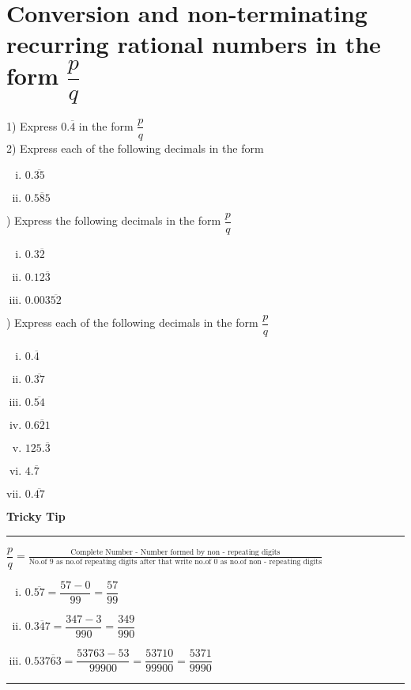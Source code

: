 \documentclass[a4paper,10pt]{article}
\begin{document}
\section{Conversion and non-terminating recurring rational numbers in
the form $\dfrac{p}{q}$}
1) Express $0.\overline{4}$ in the form $\dfrac{p}{q}$\\
2) Express each of the following decimals in the form 
\begin{multicols}{2}
\begin{enumerate}[(i)]
\item $0.\overline{35}$
\item $0.\overline{585}$
\end{enumerate}
\end{multicols}
) Express the following decimals in the form $\dfrac{p}{q}$
\begin{multicols}{3}
\begin{enumerate}[(i)]
\item $0.3\overline{2}$
\item $0.12\overline{3}$
\item $0.003\overline{52}$
\end{enumerate}
\end{multicols}
) Express each of the following decimals in the form $\dfrac{p}{q}$
\begin{multicols}{7}
\begin{enumerate}[(i)]
\item $0.\overline{4}$
\item $0.\overline{37}$
\item $0.\overline{54}$
\item $0.\overline{621}$
\item $125.\overline{3}$
\item $4.\overline{7}$
\item $0.\overline{47}$
\end{enumerate}
\end{multicols}
\newpage
\begin{center}
\textbf{\Large Tricky Tip}
\hrule
\vspace{3mm}
$\dfrac{p}{q} = \frac{\text{Complete Number - Number formed by non -
repeating digits}}{\text{No.of 9 as no.of repeating digits after that write
no.of 0 as no.of non - repeating digits}}$
\begin{enumerate}[(i)]
\item  $0.\overline{57} = \dfrac{57-0}{99} = \dfrac{57}{99}$
\item $0.\overline{347} = \dfrac{347-3}{990} = \dfrac{349}{990}$
\item $0.53\overline{763} = \dfrac{53763-53}{99900} =
\dfrac{53710}{99900} = \dfrac{5371}{9990}$
\end{enumerate}
\hrule
\end{center}
\end{document}
